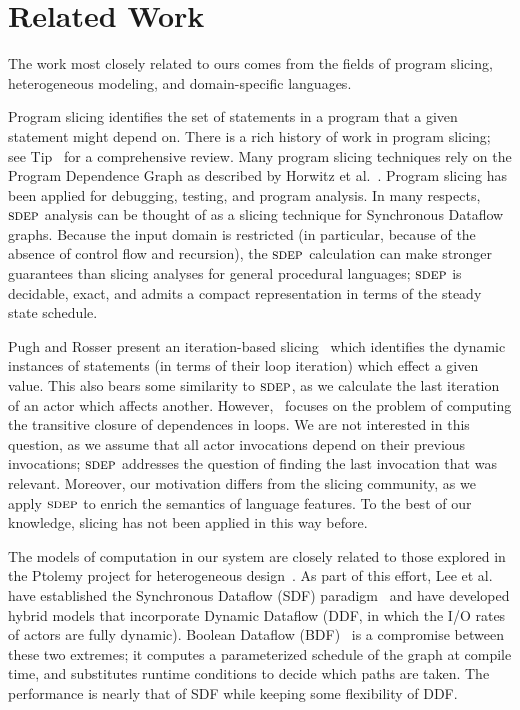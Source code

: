 \section{Related Work}

The work most closely related to ours comes from the fields of program
slicing, heterogeneous modeling, and domain-specific languages.

Program slicing identifies the set of statements in a program that a
given statement might depend on.  There is a rich history of work in
program slicing; see Tip~\cite{tip95slice} for a comprehensive review.
Many program slicing techniques rely on the Program Dependence Graph
as described by Horwitz et al.~\cite{hrb88pdg}.  Program slicing has
been applied for debugging, testing, and program analysis.  In many
respects, $\textsc{sdep}$ analysis can be thought of as a slicing technique
for Synchronous Dataflow graphs.  Because the input domain is
restricted (in particular, because of the absence of control flow and
recursion), the $\textsc{sdep}$ calculation can make stronger guarantees than
slicing analyses for general procedural languages; $\textsc{sdep}$ is
decidable, exact, and admits a compact representation in terms of the
steady state schedule.

Pugh and Rosser present an iteration-based slicing~\cite{pugh97slice}
which identifies the dynamic instances of statements (in terms of
their loop iteration) which effect a given value.  This also bears
some similarity to $\textsc{sdep}$, as we calculate the last iteration of an
actor which affects another.  However,~\cite{pugh97slice} focuses on the
problem of computing the transitive closure of dependences in loops.
We are not interested in this question, as we assume that all actor
invocations depend on their previous invocations; $\textsc{sdep}$ addresses
the question of finding the last invocation that was relevant.
Moreover, our motivation differs from the slicing community, as we
apply $\textsc{sdep}$ to enrich the semantics of language features.  To the
best of our knowledge, slicing has not been applied in this way
before.

The models of computation in our system are closely related to those
explored in the Ptolemy project for heterogeneous
design~\cite{ptolemy03overview}.  As part of this effort, Lee et
al. have established the Synchronous Dataflow (SDF)
paradigm~\cite{LM87-i} and have developed hybrid models that
incorporate Dynamic Dataflow (DDF, in which the I/O rates of actors
are fully dynamic).  Boolean Dataflow (BDF)~\cite{ha97profile} is a
compromise between these two extremes; it computes a parameterized
schedule of the graph at compile time, and substitutes runtime
conditions to decide which paths are taken.  The performance is nearly
that of SDF while keeping some flexibility of DDF.  

